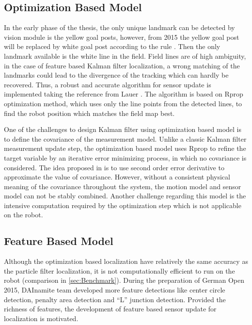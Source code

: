 \subsection{Optimization Based Model}\label{sec:optimization update} 
In the early phase of the thesis, the only unique landmark can be detected by vision module is the yellow goal posts, however, from 2015 the yellow goal post will be replaced by white goal post according to the rule \cite{Committee2013}. Then the only landmark available is the white line in the field. Field lines are of high ambiguity, in the case of feature based Kalman filter localization, a wrong matching of the landmarks could lead to the divergence of the tracking which can hardly be recovered. Thus, a robust and accurate algorithm for sensor update is implemented taking the reference from Lauer \cite{Lauer2006}. The algorithm is based on Rprop \cite{Riedmiller1993} optimization method, which uses only the line points from the detected lines, to find the robot position which matches the field map best. 

One of the challenges to design Kalman filter using optimization based model is to define the covariance of the measurement model. Unlike a classic Kalman filter measurement update step, the optimization based model uses Rprop to refine the target variable by an iterative error minimizing process, in which no covariance is considered. The idea proposed in \cite{Lauer2006} is to use second order error derivative to approximate the value of covariance. However, without a consistent physical meaning of the covariance throughout the system, the motion model and sensor model can not be stably combined. Another challenge regarding this model is the intensive computation required by the optimization step which is not applicable on the robot. 



% 


\subsection{Feature Based Model}\label{sec:feature update} 
Although the optimization based localization have relatively the same accuracy as the particle filter localization, it is not computationally efficient to run on the robot (comparison in \autoref{sec:Benchmark}). During the preparation of German Open 2015, DAInamite team developed more feature detections like center circle detection, penalty area detection and ``L'' junction detection. Provided the richness of features, the development of feature based sensor update for localization is motivated.  

